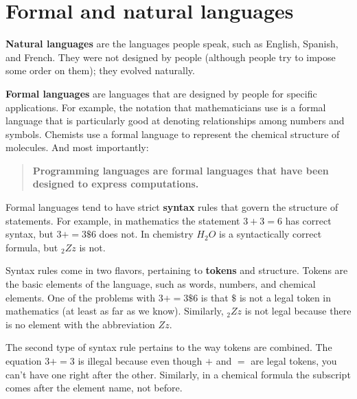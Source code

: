 


\section{Formal and natural languages}

{\bf Natural languages} are the languages people speak,
such as English, Spanish, and French. They were not designed
by people (although people try to impose some order on them);
they evolved naturally.

{\bf Formal languages} are languages that are designed by people for
specific applications. For example, the notation that mathematicians
use is a formal language that is particularly good at denoting
relationships among numbers and symbols. Chemists use a formal
language to represent the chemical structure of molecules. And
most importantly:

\begin{quote}
{\bf Programming languages are formal languages that have been
designed to express computations.}
\end{quote}

Formal languages tend to have strict {\bf syntax} rules that
govern the structure of statements.
For example, in mathematics the statement
$3 + 3 = 6$ has correct syntax, but
$3 + = 3 \$ 6$ does not. In chemistry
$H_2O$ is a syntactically correct formula, but $_2Zz$ is not.

Syntax rules come in two flavors, pertaining to {\bf tokens} and
structure. Tokens are the basic elements of the language, such as
words, numbers, and chemical elements. One of the problems with
$3 += 3 \$ 6$ is that \( \$ \) is not a legal token in mathematics
(at least as far as we know). Similarly, $_2Zz$ is not legal because
there is no element with the abbreviation $Zz$.

The second type of syntax rule pertains to the way tokens are
combined. The equation $3 += 3$ is illegal because even though $+$
and $=$ are legal tokens, you can't have one right after the other.
Similarly, in a chemical formula the subscript comes after the element
name, not before.

